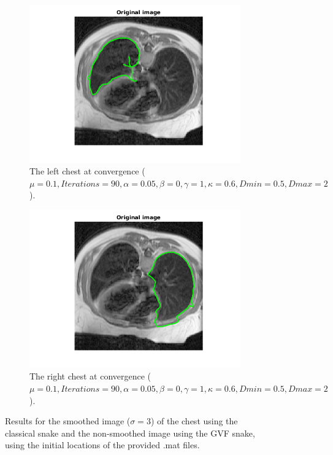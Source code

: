 \documentclass{article}
\begin{document}
\begin{figure}[h!]
\begin{subfigure}{0.49\textwidth}
  \centering
  \includegraphics[width=\linewidth]{chestLeftGFV.png}
  \caption{The left chest at convergence ($\mu=0.1, Iterations=90, \alpha=0.05, \beta=0, \gamma=1,\kappa=0.6,Dmin=0.5,Dmax=2$).}
  \label{fig4c}
\end{subfigure}
\begin{subfigure}{0.49\textwidth}
  \centering
  \includegraphics[width=\linewidth]{chestRightGFV.png}
  \caption{The right chest at convergence ($\mu=0.1, Iterations=90, \alpha=0.05, \beta=0, \gamma=1,\kappa=0.6,Dmin=0.5,Dmax=2$).}
  \label{fig4d}
\end{subfigure}
\caption{Results for the smoothed image ($\sigma=3$) of the chest using the classical snake and the non-smoothed image using the GVF snake, using the initial locations of the provided .mat files.}
\label{fig4}
\end{figure}
\end{document}
